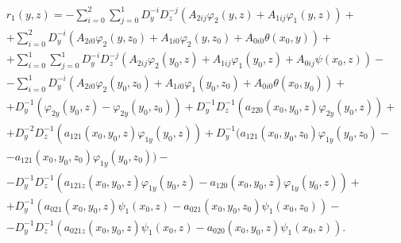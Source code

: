 \begin{gather*} 


r_1(y,z)=-\sum^2_{i=0}\sum^1_{j=0}D^{-i}_y D^{-j}_z 


(A_{2ij}\varphi_2(y,z)+A_{1ij}\varphi_1(y,z))+ \\ 


% 


+\sum^2_{i=0}D^{-i}_y  


(A_{2i0}\varphi_2(y,z_0)+A_{1i0}\varphi_2(y,z_0)+ 


A_{0i0}\theta(x_0,y))+ \\ 


% 


+\sum^1_{i=0}\sum^1_{j=0}D^{-i}_y D^{-j}_z


(A_{2ij}\varphi_2(y_0,z)+A_{1ij}\varphi_1(y_0,z)+ 


A_{0ij}\psi(x_0,z))- \\ 


% 


-\sum^1_{i=0}D^{-i}_y  


(A_{2i0}\varphi_2(y_0,z_0)+A_{1i0}\varphi_1(y_0,z_0)+ 


A_{0i0}\theta(x_0,y_0))+ \\ 


% 


+D^{-1}_y(\varphi_{2y}(y_0,z)-\varphi_{2y}(y_0,z_0))+ 


D^{-1}_y D^{-1}_z(a_{220}(x_0,y_0,z) 


\varphi_{2y}(y_0,z))+ \\ 


% 


+D^{-2}_y D^{-1}_z(a_{121}(x_0,y_0,z)\varphi_{1y}(y_0,z))+ 


D^{-1}_y(a_{121}(x_0,y_0,z_0)\varphi_{1y}(y_0,z_0)- \\ 


% 


-a_{121}(x_0,y_0,z_0)\varphi_{1y}(y_0,z_0))- \\ 


% 


-D^{-1}_y D^{-1}_z(a_{121z}(x_0,y_0,z)\varphi_{1y}(y_0,z)- 


a_{120}(x_0,y_0,z)\varphi_{1y}(y_0,z))+ \\ 


% 


+D^{-1}_y(a_{021}(x_0,y_0,z)\psi_1(x_0,z)- 


a_{021}(x_0,y_0,z_0)\psi_1(x_0,z_0))- \\ 


% 


-D^{-1}_y D^{-1}_z(a_{021z}(x_0,y_0,z)\psi_1(x_0,z)- 


a_{020}(x_0,y_0,z)\psi_1(x_0,z)). 


\end{gather*} 


